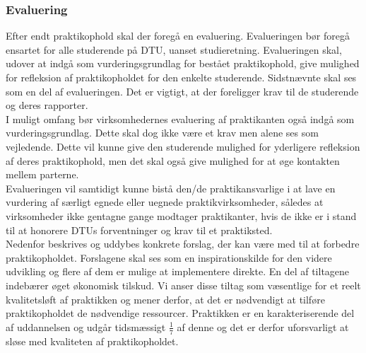 \subsubsection{Evaluering}
Efter endt praktikophold skal der foregå en evaluering. Evalueringen bør foregå ensartet for alle studerende på DTU, uanset studieretning. Evalueringen skal, udover at indgå som vurderingsgrundlag for bestået praktikophold, give mulighed for refleksion af praktikopholdet for den enkelte studerende. Sidstnævnte skal ses som en del af evalueringen. Det er vigtigt, at der foreligger krav til de studerende og deres rapporter.\\

I muligt omfang bør virksomhedernes evaluering af praktikanten også indgå som vurderingsgrundlag. Dette skal dog ikke være et krav men alene ses som vejledende. Dette vil kunne give den studerende mulighed for yderligere refleksion af deres praktikophold, men det skal også give mulighed for at øge kontakten mellem parterne. \\

Evalueringen vil samtidigt kunne bistå den/de praktikansvarlige i at lave en vurdering af særligt egnede eller uegnede praktikvirksomheder, således at virksomheder ikke gentagne gange modtager praktikanter, hvis de ikke er i stand til at honorere DTUs forventninger og krav til et praktiksted.\\

Nedenfor beskrives og uddybes konkrete forslag, der kan være med til at forbedre praktikopholdet. Forslagene skal ses som en inspirationskilde for den videre udvikling og flere af dem er mulige at implementere direkte. En del af tiltagene indebærer øget økonomisk tilskud. Vi anser disse tiltag som væsentlige for et reelt kvalitetsløft af praktikken og mener derfor, at det er nødvendigt at tilføre praktikopholdet de nødvendige ressourcer. Praktikken er en karakteriserende del af uddannelsen og udgår tidsmæssigt $\frac{1}{7}$ af denne og det er derfor uforsvarligt at sløse med kvaliteten af praktikopholdet.

